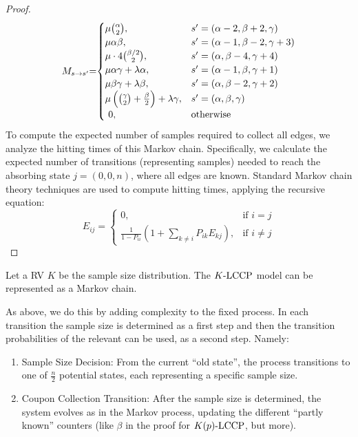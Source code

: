 \begin{proof}
\vspace{-2.5ex}
\begin{equation}
\label{transistion_matrix_markov_(1;2)-MECD}
M_{s \to \ns}
\hspace{-0.1cm}=\hspace{-0.1cm}
\begin{cases}
%
\mu \binom{\alpha}{2}, & 
\ns = (\alpha - 2, \beta + 2, \gamma)\\
%
\mu \alpha \beta, &
\ns = (\alpha - 1, \beta - 2, \gamma + 3) \\
%
\mu \cdot 4 \binom{\beta/2}{2}, &
\ns = (\alpha,\beta - 4, \gamma + 4) \\
%
\mu \alpha \gamma + \lambda \alpha, & 
\ns = (\alpha - 1,\beta, \gamma + 1) \\
%
\mu \beta \gamma + \lambda \beta, & 
\ns = (\alpha, \beta - 2, \gamma + 2) \\
%
\mu \left(\binom{\gamma}{2} + \frac{\beta}{2}\right) + \lambda \gamma, & 
\ns = (\alpha, \beta, \gamma) \\
%
\ 0, & \text{otherwise}
\end{cases}
\end{equation}
To compute the expected number of samples required to collect all edges,
we analyze the hitting times of this Markov chain.
Specifically, we calculate the expected number of transitions (representing samples)
needed to reach the absorbing state $j=(0,0,n)$,
where all edges are known.
Standard Markov chain theory techniques are used to compute hitting times,
applying the recursive equation:
\[
E_{ij} = \begin{cases} 
0, & \text{if } i = j \\
\frac{1}{1 - P_{ii}} \left( 1 + \sum_{k \neq i} P_{ik} E_{kj} \right), & \text{if } i \neq j 
\end{cases}
\]
\end{proof}
\begin{claim}
    Let a RV $K$ be the sample size distribution. 
    The $\fmecd{K}{}{n}$ model can be represented as a Markov chain.
\end{claim}
As above, we do this by adding complexity to the fixed \ekecd[k] process.
In each transition the sample size is determined as a first step and then the transition probabilities of the relevant \ekecd[k] can be used, as a second step.
Namely:
\begin{enumerate}
    \item 
    Sample Size Decision: From the current 
    ``old state'', the process transitions to one of $\frac{n}{2}$ potential states, each representing a specific sample size.
    \item 
    Coupon Collection Transition: After the sample size is determined, the system evolves as in the \ekecd[k] Markov process, updating the different ``partly known'' counters (like $\beta$ in the proof for $\fmecd{K(p)}{}{}$, but more).
\end{enumerate}

